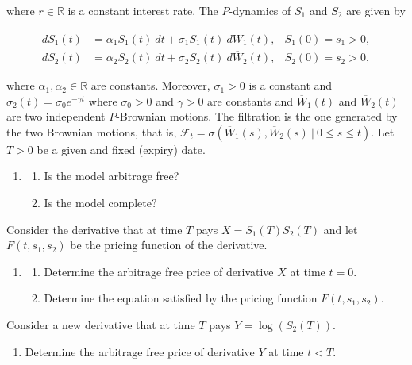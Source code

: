 \documentclass[
]{book}
\providecommand{\tightlist}{%
  \setlength{\itemsep}{0pt}\setlength{\parskip}{0pt}}
\begin{document}
where \(r\in\mathbb{R}\) is a constant interest rate. The \(P\)-dynamics of \(S_1\) and \(S_2\) are given by

\begin{align*}
dS_1(t)&=\alpha_1S_1(t)\ dt+\sigma_1S_1(t)\ d\overline{W}_1(t),&S_1(0)=s_1>0,\\
dS_2(t)&=\alpha_2S_2(t)\ dt+\sigma_2S_2(t)\ d\overline{W}_2(t),&S_2(0)=s_2>0,
\end{align*}

where \(\alpha_1,\alpha_2\in\mathbb{R}\) are constants. Moreover, \(\sigma_1>0\) is a constant and \(\sigma_2(t)=\sigma_0e^{-\gamma t}\) where \(\sigma_0>0\) and \(\gamma>0\) are constants and \(\overline{W}_1(t)\) and \(\overline{W}_2(t)\) are two independent \(P\)-Brownian motions. The filtration is the one generated by the two Brownian motions, that is, \(\mathcal{F}_t=\sigma(\overline{W}_1(s),\overline{W}_2(s)\ \vert\ 0\le s\le t)\). Let \(T>0\) be a given and fixed (expiry) date.

\begin{enumerate}
\def\labelenumi{\alph{enumi}.}
\item
  \begin{enumerate}
  \def\labelenumii{\roman{enumii}.}
  \tightlist
  \item
    Is the model arbitrage free?
  \item
    Is the model complete?
  \end{enumerate}
\end{enumerate}

Consider the derivative that at time \(T\) pays \(X=S_1(T)S_2(T)\) and let \(F(t,s_1,s_2)\) be the pricing function of the derivative.

\begin{enumerate}
\def\labelenumi{\alph{enumi}.}
\setcounter{enumi}{1}
\item
  \begin{enumerate}
  \def\labelenumii{\roman{enumii}.}
  \tightlist
  \item
    Determine the arbitrage free price of derivative \(X\) at time \(t=0\).
  \item
    Determine the equation satisfied by the pricing function \(F(t,s_1,s_2)\).
  \end{enumerate}
\end{enumerate}

Consider a new derivative that at time \(T\) pays \(Y=\log(S_2(T))\).

\begin{enumerate}
\def\labelenumi{\alph{enumi}.}
\setcounter{enumi}{2}
\tightlist
\item
  Determine the arbitrage free price of derivative \(Y\) at time \(t<T\).
\end{enumerate}
\end{document}
